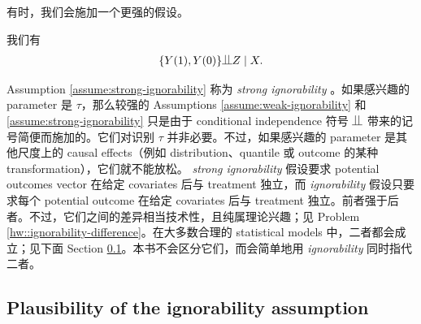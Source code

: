 有时，我们会施加一个更强的假设。

\begin{assumption}
\label{assume:strong-ignorability}
我们有 
\begin{eqnarray}
 \{  Y(1), Y(0)  \} \ind Z \mid X .
  \label{eq::strong-ignorability}
\end{eqnarray}
\end{assumption}


Assumption \ref{assume:strong-ignorability} 称为 {\it strong ignorability} \citep{rubin1978bayesian, rosenbaum1983central}。如果感兴趣的 parameter 是 $\tau$，那么较强的 Assumptions \ref{assume:weak-ignorability} 和 \ref{assume:strong-ignorability} 只是由于 conditional independence 符号 $\ind$ 带来的记号简便而施加的。它们对识别 $\tau$ 并非必要。不过，如果感兴趣的 parameter 是其他尺度上的 causal effects（例如 distribution、quantile 或 outcome 的某种 transformation），它们就不能放松。
{\it strong ignorability} 假设要求 potential outcomes vector 在给定 covariates 后与 treatment 独立，而 {\it ignorability} 假设只要求每个 potential outcome 在给定 covariates 后与 treatment 独立。前者强于后者。不过，它们之间的差异相当技术性，且纯属理论兴趣；见 Problem \ref{hw::ignorability-difference}。在大多数合理的 statistical models 中，二者都会成立；见下面 Section \ref{sec::plausibility-ignorability}。本书不会区分它们，而会简单地用 {\it ignorability} 同时指代二者。 
 
 
 
 
 
 \subsection{Plausibility of the ignorability assumption} \label{sec::plausibility-ignorability}



